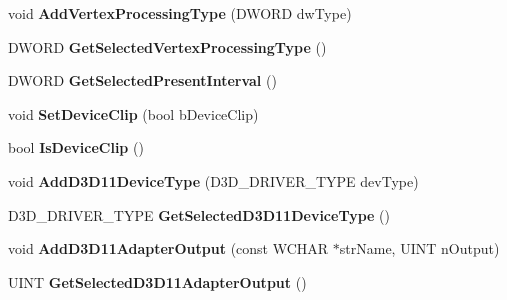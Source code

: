 \begin{DoxyCompactItemize}
\item 
\hypertarget{class_c_d3_d_settings_dlg_aa2351f6a7dfaf409b4a1590e4f6c01a8}{void {\bfseries Add\+Vertex\+Processing\+Type} (D\+W\+O\+R\+D dw\+Type)}\label{class_c_d3_d_settings_dlg_aa2351f6a7dfaf409b4a1590e4f6c01a8}

\item 
\hypertarget{class_c_d3_d_settings_dlg_a1c3324649ea149106ca0af2c43f880fe}{D\+W\+O\+R\+D {\bfseries Get\+Selected\+Vertex\+Processing\+Type} ()}\label{class_c_d3_d_settings_dlg_a1c3324649ea149106ca0af2c43f880fe}

\item 
\hypertarget{class_c_d3_d_settings_dlg_a7819f5df57f56524015c396ef625809e}{D\+W\+O\+R\+D {\bfseries Get\+Selected\+Present\+Interval} ()}\label{class_c_d3_d_settings_dlg_a7819f5df57f56524015c396ef625809e}

\item 
\hypertarget{class_c_d3_d_settings_dlg_ab5e85523266807441c34a4439163550f}{void {\bfseries Set\+Device\+Clip} (bool b\+Device\+Clip)}\label{class_c_d3_d_settings_dlg_ab5e85523266807441c34a4439163550f}

\item 
\hypertarget{class_c_d3_d_settings_dlg_ac5d2815eced3dcc37c0313ffd1e522ca}{bool {\bfseries Is\+Device\+Clip} ()}\label{class_c_d3_d_settings_dlg_ac5d2815eced3dcc37c0313ffd1e522ca}

\item 
\hypertarget{class_c_d3_d_settings_dlg_a8f24801ec27fdcd74bf90bf17af65c04}{void {\bfseries Add\+D3\+D11\+Device\+Type} (D3\+D\+\_\+\+D\+R\+I\+V\+E\+R\+\_\+\+T\+Y\+P\+E dev\+Type)}\label{class_c_d3_d_settings_dlg_a8f24801ec27fdcd74bf90bf17af65c04}

\item 
\hypertarget{class_c_d3_d_settings_dlg_a63bb331b17c642d7a3885108656147d3}{D3\+D\+\_\+\+D\+R\+I\+V\+E\+R\+\_\+\+T\+Y\+P\+E {\bfseries Get\+Selected\+D3\+D11\+Device\+Type} ()}\label{class_c_d3_d_settings_dlg_a63bb331b17c642d7a3885108656147d3}

\item 
\hypertarget{class_c_d3_d_settings_dlg_a914e17582d81a73406f84b7100167e17}{void {\bfseries Add\+D3\+D11\+Adapter\+Output} (const W\+C\+H\+A\+R $\ast$str\+Name, U\+I\+N\+T n\+Output)}\label{class_c_d3_d_settings_dlg_a914e17582d81a73406f84b7100167e17}

\item 
\hypertarget{class_c_d3_d_settings_dlg_a7c2a6774bc0717e569255b226725db09}{U\+I\+N\+T {\bfseries Get\+Selected\+D3\+D11\+Adapter\+Output} ()}\label{class_c_d3_d_settings_dlg_a7c2a6774bc0717e569255b226725db09}


\end{DoxyCompactItemize}
